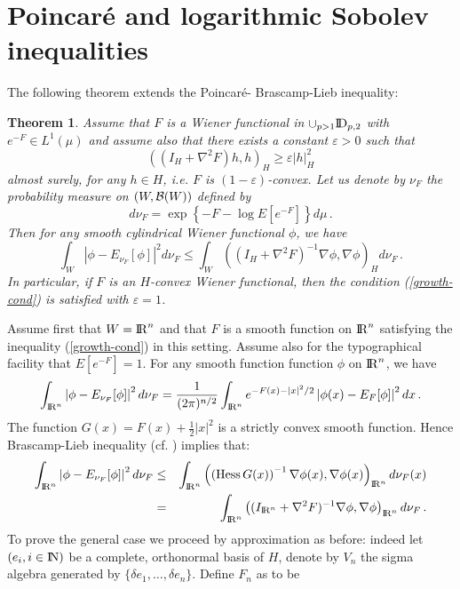 \documentclass[12pt,a4paper]{book}
\newtheorem{theorem}{Theorem}[section]
\newcommand{\beaa}{\begin{eqnarray*}}
\newcommand{\eeaa}{\end{eqnarray*}}
\newcommand{\eps}{\varepsilon}
\newcommand{\NN}{{\rm I\!N}}
\newcommand{\DD}{{\rm I\!D}}
\newcommand{\calB}{{\cal B}}
\newcommand{\R}{{\rm I\!R}}
\newcommand{\proof}{\noindent {\bf Proof:\ }}
\begin{document}
\section{Poincar\'e and logarithmic Sobolev inequalities}
The following theorem  extends the Poincar\'e- Brascamp-Lieb
inequality:
\begin{theorem}
\label{B-L-thm}
Assume that $F$ is a Wiener functional in
$\cup_{p>1}\DD_{p,2}$ with $e^{-F}\in L^1(\mu)$ and assume also  that  there
exists a constant $\eps>0$ such that
\begin{equation}
\label{growth-cond}
\left((I_H+\nabla^2F)h,h\right)_H\geq \eps |h|_H^2
\end{equation}
almost surely, for any $h\in H$, i.e. $F$ is $(1-\eps)$-convex.
Let us denote by $\nu_F$ the
probability measure on $(W,\calB(W))$ defined by
$$
d\nu_F=\exp\left\{-F-\log E\left[e^{-F}\right]\right\}d\mu\,.
$$
Then for any smooth cylindrical Wiener
functional $\phi$, we have
\begin{equation}
\label{poincare-ineq}
\int_W|\phi-E_{\nu_F}[\phi]|^2d\nu_F\leq \int_W\left((I_H+\nabla^2F)^{-1}\nabla
\phi,\nabla \phi\right)_Hd\nu_F\,.
\end{equation}
In particular, if $F$ is an $H$-convex Wiener functional, then the
condition (\ref{growth-cond}) is satisfied with $\eps=1$.
\end{theorem}
\proof
Assume first that $W=\R^n$ and that $F$ is a smooth  function
on $\R^n$ satisfying the inequality (\ref{growth-cond}) in this
setting. Assume also for the typographical facility that
$E[e^{-F}]=1$. For any smooth function function $\phi$ on $\R^n$, we have
\begin{equation}
\label{fin-dim}
\int_{\R^n}\left|\phi-E_{\nu_F}[\phi]\right|^2d\nu_F=\frac{1}{(2\pi)^{n/2}}
\int_{\R^n} e^{-F(x)-|x|^2/2}\left|\phi(x)-E_F[\phi]\right|^2dx\,.
\end{equation}
The function $G(x)=F(x)+\frac{1}{2}|x|^2$ is a strictly convex smooth
function. Hence Brascamp-Lieb inequality (cf. \cite{BLI})
implies that:
\beaa
\int_{\R^n}\left|\phi-E_{\nu_F}[\phi]\right|^2d\nu_F&\leq&\int_{\R^n}\left
(\left({\mbox{\rm
        Hess}}\,G(x)\right)^{-1}\nabla\phi(x),\nabla\phi(x)\right)_{\R^n}d\nu_F(x)\\
&=&\int_{\R^n}\left((I_{\R^n}+\nabla^2F)^{-1}\nabla\phi,\nabla\phi\right)_
{\R^n}d\nu_F\,.
\eeaa
To prove the general case we proceed by approximation as before:
indeed let $(e_i,i\in \NN)$ be a complete,
orthonormal basis of $H$, denote by $V_n$ the sigma algebra generated
by $\{\delta e_1,\ldots,\delta e_n\}$. Define $F_n$ as to be
\end{document}
